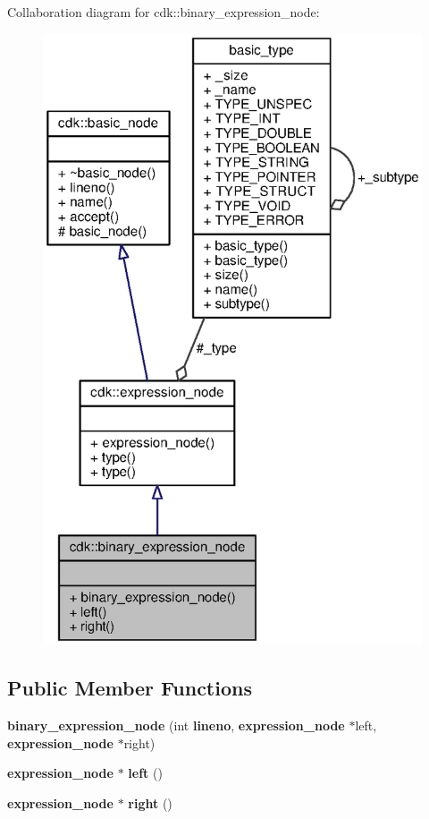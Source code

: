 Collaboration diagram for cdk\+:\+:binary\+\_\+expression\+\_\+node\+:
\nopagebreak
\begin{figure}[H]
\begin{center}
\leavevmode
\includegraphics[width=325pt]{classcdk_1_1binary__expression__node__coll__graph}
\end{center}
\end{figure}
\subsection*{Public Member Functions}
\begin{DoxyCompactItemize}
\item 
{\bf binary\+\_\+expression\+\_\+node} (int {\bf lineno}, {\bf expression\+\_\+node} $\ast$left, {\bf expression\+\_\+node} $\ast$right)
\item 
{\bf expression\+\_\+node} $\ast$ {\bfseries left} ()\label{classcdk_1_1binary__expression__node_a8ac0b884a1ea56ed16d78997066d120d}

\item 
{\bf expression\+\_\+node} $\ast$ {\bfseries right} ()\label{classcdk_1_1binary__expression__node_a763e869d08583a828bd1b6b5433dde52}

\end{DoxyCompactItemize}
